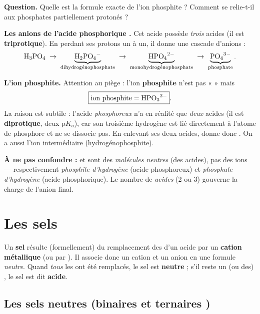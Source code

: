 \documentclass[11pt,a4paper]{article}
\begin{document}
\begin{exemple}
\textbf{Question.} Quelle est la formule exacte de l'ion phosphite ? Comment se relie-t-il aux phosphates
partiellement protonés ?

\smallskip
\textbf{Les anions de l'acide phosphorique .} Cet acide possède \emph{trois}  acides
(il est \textbf{triprotique}). En perdant ses protons un à un, il donne une cascade d'anions :
\[ \ce{H3PO4} \;\to\; \underbrace{\ce{H2PO4-}}_{\text{dihydrogénophosphate}} \;\to\;
   \underbrace{\ce{HPO4^2-}}_{\text{monohydrogénophosphate}} \;\to\;
   \underbrace{\ce{PO4^3-}}_{\text{phosphate}}. \]

\textbf{L'ion phosphite.} Attention au piège : l'ion \textbf{phosphite} n'est pas «  » mais
\[ \boxed{\text{ion phosphite} = \ce{HPO3^2-}}. \]
La raison est subtile : l'acide \emph{phosphoreux}  n'a en réalité que \emph{deux} 
acides (il est \textbf{diprotique}, deux $\mathrm{p}K_a$), car son troisième hydrogène est lié directement
à l'atome de phosphore et ne se dissocie pas. En enlevant ses deux  acides,  donne donc
. On a aussi l'ion intermédiaire  (hydrogénophosphite).

\smallskip
\textbf{À ne pas confondre :}  et  sont des \emph{molécules neutres} (des acides), pas
des ions — respectivement \emph{phosphite d'hydrogène} (acide phosphoreux) et \emph{phosphate d'hydrogène}
(acide phosphorique). Le nombre de  \emph{acides} (2 ou 3) gouverne la charge de l'anion final.
\end{exemple}

\section{Les sels}
\begin{definition}[sel]
Un \textbf{sel} résulte (formellement) du remplacement des  d'un acide par un \textbf{cation
métallique} (ou par ). Il associe donc un cation et un anion en une formule \emph{neutre}. Quand
\emph{tous} les  ont été remplacés, le sel est \textbf{neutre} ; s'il reste un (ou des) , le
sel est dit \textbf{acide}.
\end{definition}

\subsection{Les sels neutres (binaires  et ternaires )}
\end{document}
